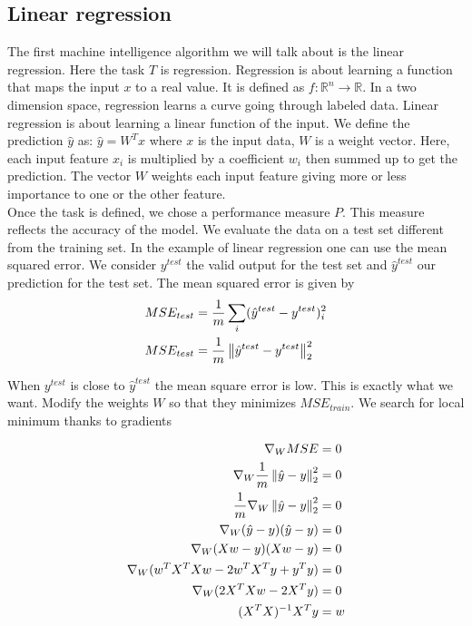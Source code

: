	\subsection{Linear regression}
		The first machine intelligence algorithm we will talk about is the linear regression. Here the task $T$ is regression. Regression  is about learning a function that maps the input $x$ to a real value. It is defined as $f:\mathbb{R}^n \rightarrow \mathbb{R}$. In a two dimension space, regression learns a curve going through labeled data.
		Linear regression is about learning  a linear function of the input. We define the prediction $\hat{y}$ as: $\hat{y}=W^Tx$ where $x$ is the input data, $W$ is a weight vector. Here, each input feature $x_i$ is multiplied by a coefficient $w_i$ then summed up to get the prediction. The vector $W$ weights each input feature giving more or less importance to one or the other feature.\\


		Once the task is defined, we chose a performance measure $P$. This measure reflects the accuracy of the model. We evaluate the data on a test set different from the training set. 
		In the example of linear regression one can use the mean squared error. We consider $y^{test}$ the valid output for the test set and $\hat{y}^{test}$ our prediction for the test set. The mean squared error is given by
		\begin{equation}
			\begin{split}
				MSE_{test} &= \frac{1}{m}\sum_{i}(\hat{y}^{test}	- y^{test})_i^2 \\
				MSE_{test} &= \frac{1}{m}   \left\lVert\hat{y}^{test}	- y^{test}\right\rVert_2^2
			\end{split}
		\end{equation}

		When $y^{test}$ is close to $\hat{y}^{test}$ the mean square error is low. This is exactly what we want. Modify the weights $W$ so that they minimizes $MSE_{train}$. We search for local minimum thanks to gradients

		\begin{equation} \label{eq1}
			\begin{split}
				\nabla_W MSE &= 0 \\
				\nabla_W \frac{1}{m} \left\lVert\hat{y} - y\right\rVert_2^2 &= 0 \\
				\frac{1}{m} \nabla_W \left\lVert\hat{y} - y\right\rVert_2^2 &= 0 \\
				\nabla_W (\hat{y} - y)(\hat{y} - y) &= 0 \\
				\nabla_W (X w - y)(X w - y) &= 0 \\
				\nabla_W (w^T X^T X w - 2 w^T X^T y + y^T y) &= 0 \\
				\nabla_W (2 X^T X w - 2 X^T y) &= 0 \\
				(X^T X)^{-1} X^T y &= w
			\end{split}
		\end{equation}


